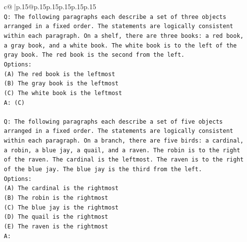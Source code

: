\documentclass{article}
\begin{document}
{\begin{supertabular}{c@{$\;$}|p{.15\linewidth}@{}p{.15\linewidth}p{.15\linewidth}p{.15\linewidth}p{.15\linewidth}p{.15\linewidth}}
{{{\\ 
\texttt{Q: The following paragraphs each describe a set of three objects arranged in a fixed order. The statements are logically consistent within each paragraph. On a shelf, there are three books: a red book, a gray book, and a white book. The white book is to the left of the gray book. The red book is the second from the left.} \\
\texttt{Options:} \\
\texttt{(A) The red book is the leftmost} \\
\texttt{(B) The gray book is the leftmost} \\
\texttt{(C) The white book is the leftmost} \\
\texttt{A: (C)} \\
\\ 
\texttt{Q: The following paragraphs each describe a set of five objects arranged in a fixed order. The statements are logically consistent within each paragraph. On a branch, there are five birds: a cardinal, a robin, a blue jay, a quail, and a raven. The robin is to the right of the raven. The cardinal is the leftmost. The raven is to the right of the blue jay. The blue jay is the third from the left.} \\
\texttt{Options:} \\
\texttt{(A) The cardinal is the rightmost} \\
\texttt{(B) The robin is the rightmost} \\
\texttt{(C) The blue jay is the rightmost} \\
\texttt{(D) The quail is the rightmost} \\
\texttt{(E) The raven is the rightmost} \\
\texttt{A:} \\
            }
        }
    }
     \\ \\


\end{supertabular}}
\end{document}
